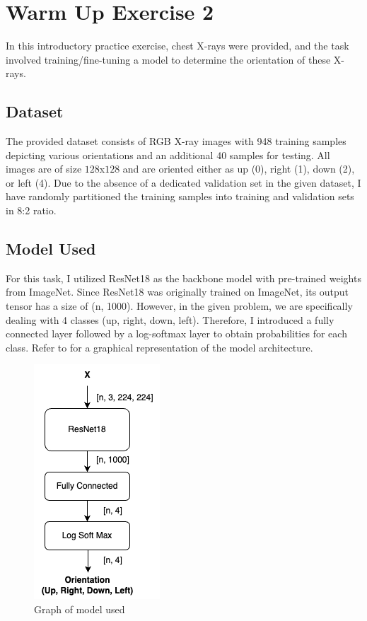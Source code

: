 \section{Warm Up Exercise 2}
\label{sec:warmup2}

    In this introductory practice exercise, chest X-rays were provided, and the task involved training/fine-tuning a model to determine the orientation of these X-rays.

\subsection{Dataset}
    The provided dataset consists of RGB X-ray images with 948 training samples depicting various orientations and an additional 40 samples for testing. All images are of size $128$x$128$ and are oriented either as up (0), right (1), down (2), or left (4). Due to the absence of a dedicated validation set in the given dataset, I have randomly partitioned the training samples into training and validation sets in 8:2 ratio. 
\subsection{Model Used}

    For this task, I utilized ResNet18 as the backbone model with pre-trained weights from ImageNet. Since ResNet18 was originally trained on ImageNet, its output tensor has a size of (n, 1000). However, in the given problem, we are specifically dealing with 4 classes (up, right, down, left). Therefore, I introduced a fully connected layer followed by a log-softmax layer to obtain probabilities for each class. Refer to  for a graphical representation of the model architecture.
    
    \begin{figure}[htbp]
        \centering
        \includegraphics[width=0.4\linewidth]{images/Warkup1-2.png}
        \caption{Graph of model used}
        \label{fig:model_graph}
    \end{figure}

